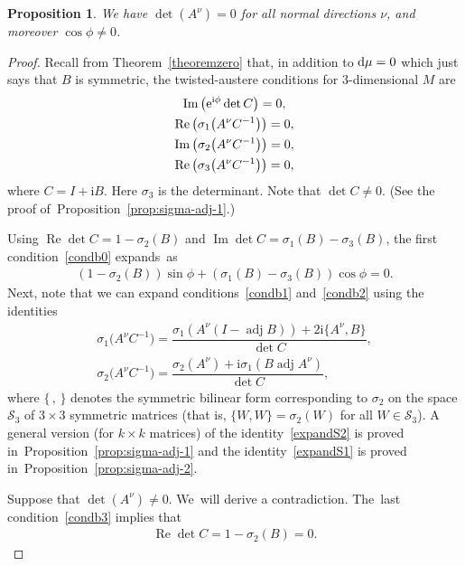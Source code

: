 \documentclass[10pt,a4paper]{amsart}
\def\ri{\mathrm{i}}
\renewcommand{\Im}{\operatorname{Im}}
\renewcommand{\Re}{\operatorname{Re}}
\def\adj{\operatorname{adj}}
\def\calS{\mathcal{S}}
\newtheorem{Proposition}[Theorem]{Proposition}
\numberwithin{equation}{section}
\begin{document}
\begin{Proposition} \label{thm1step1}
We have $\det (A^\nu) = 0$ for all normal directions $\nu$, and moreover $\cos \phi \ne 0$.
\end{Proposition}
\begin{proof}
Recall from Theorem~\ref{theoremzero} that, in addition to ${\rm d} \mu = 0$ which just says that $B$ is symmetric, the twisted-austere conditions for $3$-dimensional $M$ are
\begin{gather}
\Im \big({\rm e}^{\ri \phi} \det C\big) = 0, \label{condb0} \\
\Re \big(\sigma_1 \big(A^\nu C^{-1}\big) \big) = 0, \label{condb1} \\
\Im \big(\sigma_2 \big(A^\nu C^{-1}\big) \big) = 0, \label{condb2} \\
\Re \big(\sigma_3 \big(A^\nu C^{-1}\big) \big) = 0, \label{condb3}
\end{gather}
where $C = I + \ri B$. Here $\sigma_3$ is the determinant. Note that $\det C \neq 0$. (See the proof of~Pro\-position~\ref{prop:sigma-adj-1}.)

Using $\Re \det C = 1-\sigma_2(B)$ and $\Im \det C = \sigma_1(B) - \sigma_3(B)$, the first condition~\eqref{condb0} ex\-pands~as
\begin{gather} \label{expandet}
(1-\sigma_2(B)) \sin \phi + (\sigma_1(B) - \sigma_3(B))\cos\phi = 0.
\end{gather}
Next, note that we can expand conditions~\eqref{condb1} and~\eqref{condb2} using the identities
\begin{gather}
\sigma_1\big(A^\nu C^{-1}\big) = \dfrac{\sigma_1(A^\nu (I -\adj B)) + 2\ri \{A^\nu,B\}}{\det C}, \label{expandS1} \\
\sigma_2\big(A^\nu C^{-1}\big) = \dfrac{\sigma_2(A^\nu) + \ri \sigma_1( B \adj A^\nu) }{\det C}, \label{expandS2}
\end{gather}
where $\{\,,\,\}$ denotes the symmetric bilinear form corresponding to $\sigma_2$ on the space $\calS_3$ of $3 \times 3$ symmetric matrices (that is, $\{W,W\} = \sigma_2(W)$ for all $W \in \calS_3$). A general version (for $k \times k$ matrices) of the identity~\eqref{expandS2} is proved in~Proposition~\ref{prop:sigma-adj-1} and the identity~\eqref{expandS1} is proved in~Proposition~\ref{prop:sigma-adj-2}.

Suppose that $\det(A^\nu)\ne 0$. We~will derive a contradiction. The~last condition~\eqref{condb3} implies that
\begin{gather} \label{sigmab} \Re \det C = 1-\sigma_2(B) =0.\end{gather}


\end{proof}
\end{document}
